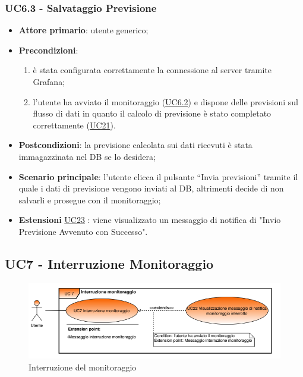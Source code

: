 	\label{par:UC6.3}
	\subsubsection{UC6.3 - Salvataggio Previsione}
		\begin{itemize}
			\item\textbf{Attore primario}: utente generico;
			\item\textbf{Precondizioni}:
				\begin{enumerate}
					\item è stata configurata correttamente la connessione al server tramite Grafana;
					\item l’utente ha avviato il monitoraggio (\hyperref[par:UC6.2]{UC6.2}) e dispone delle previsioni sul flusso di dati in quanto il calcolo di previsione è stato completato correttamente (\hyperref[par:UC21]{UC21}).
				\end{enumerate}
			\item\textbf{Postcondizioni}: la previsione calcolata sui dati ricevuti è stata immagazzinata nel DB se lo desidera;
			\item\textbf{Scenario principale}: l’utente clicca il pulsante “Invia previsioni” tramite il quale i dati di previsione vengono inviati al DB, altrimenti decide di non salvarli e prosegue con il monitoraggio;
			\item\textbf{Estensioni} \hyperref[par:UC23]{UC23} : viene visualizzato un messaggio di notifica di "Invio Previsione Avvenuto con Successo".
		\end{itemize}	


	\label{par:UC7}
	\subsection{UC7 - Interruzione Monitoraggio}

	\begin{figure}[H]
		\centering
		\includegraphics[scale=0.80]{../Analisi_dei_requisiti/img/Diagrammi_UML/UC7_Interruzione_monitoraggio.png}
		\caption{Interruzione del monitoraggio}
	\end{figure}

